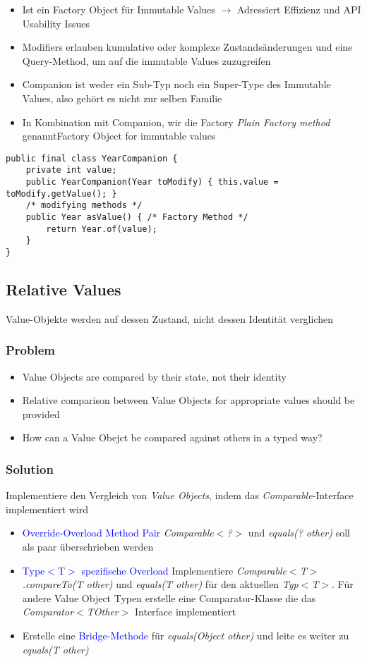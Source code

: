 \begin{itemize}
    \item Ist ein Factory Object für Immutable Values $\rightarrow$ Adressiert Effizienz und API Usability Issues
    \item Modifiers erlauben kumulative oder komplexe Zustandsänderungen und eine Query-Method, um auf die immutable Values zuzugreifen
    \item Companion ist weder ein Sub-Typ noch ein Super-Type des Immutable Values, also gehört es nicht zur selben Familie
    \item In Kombination mit Companion, wir die Factory \textit{Plain Factory method} genanntFactory Object for immutable values
\end{itemize}
\begin{lstlisting}
public final class YearCompanion {
    private int value;
    public YearCompanion(Year toModify) { this.value = toModify.getValue(); }
    /* modifying methods */
    public Year asValue() { /* Factory Method */
        return Year.of(value);
    }
}
\end{lstlisting}

\subsection{Relative Values}

Value-Objekte werden auf dessen Zustand, nicht dessen Identität verglichen

\subsubsection{Problem}
\begin{itemize}
    \item Value Objects are compared by their state, not their identity
    \item Relative comparison between Value Objects for appropriate values should be provided
    \item How can a Value Obejct be compared against others in a typed way?
\end{itemize}
\subsubsection{Solution}
Implementiere den Vergleich von \textit{Value Objects}, indem das \textit{Comparable}-Interface implementiert wird

\begin{itemize}
    \item \textcolor{blue}{Override-Overload Method Pair} \textit{Comparable$<$?$>$} und \textit{equals(? other)} soll als paar überschrieben werden
    \item \textcolor{blue}{Type$<$T$>$ spezifische Overload} Implementiere \textit{Comparable$<$T$>$.compareTo(T other)} und \textit{equals(T other)} für den aktuellen \textit{Typ$<$T$>$}. Für andere Value Object Typen erstelle eine Comparator-Klasse die das \textit{Comparator$<$TOther$>$} Interface implementiert
    \item Erstelle eine \textcolor{blue}{Bridge-Methode} für \textit{equals(Object other)} und leite es weiter zu \textit{equals(T other)}
\end{itemize}


